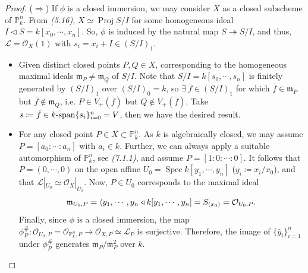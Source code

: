 \documentclass[11pt,a4paper,footinclude=true,headinclude=true]{scrbook} %
\DeclareMathOperator{\Spec}{Spec}
\DeclareMathOperator{\Proj}{Proj}
\newcommand{\LL}{\mathscr{L}}
\newcommand{\OO}{\mathcal{O}}
\newcommand{\PP}{\mathbb{P}}
\newcommand{\mm}{\mathfrak{m}}
\newcommand{\<}{\langle}
\let\>\relax
\newcommand{\>}{\rangle}
\newcommand{\spn}{\mathchar`-\mathrm{span}}
\begin{document}
\begin{proof}
    ($\Rightarrow$) If $\phi$ is a closed immersion, we may consider $X$ as a closed subscheme of $\PP_k^n$. From \textit{(5.16)}, $X\simeq\Proj S/I$ for some homogeneous ideal $I\triangleleft S=k[x_0,\cdots,x_n]$. So, $\phi$ is induced by the natural map $S\twoheadrightarrow S/I$, and thus, $\LL=\OO_X(1)$ with $s_i=x_i+I\in(S/I)_1$.
    \begin{itemize}
        \item[(1)] Given distinct closed points $P,Q\in X$, corresponding to the homogeneous maximal ideals $\mm_P\neq\mm_Q$ of $S/I$. Note that $S/I=k[s_0,\cdots,s_n]$ is finitely generated by $(S/I)_1$ over $(S/I)_0=k$, so $\exists\ \bar{f}\in(S/I)_1$ for which $\bar{f}\in\mm_P$ but $\bar{f}\notin\mm_Q$, i.e. $P\in V_+(\bar{f})$ but $Q\notin V_+(\bar{f})$. Take $s\coloneqq\bar{f}\in k\spn\{s_i\}_{i=0}^n=V$, then we have the desired result.
        \item[(2)] For any closed point $P\in X\subset\PP_k^n$. As $k$ is algebraically closed, we may assume $P=[a_0:\cdots:a_n]$ with $a_i\in k$. Further, we can always apply a suitable automorphism of $\PP_k^n$, see \textit{(7.1.1)}, and assume $P=[1:0:\cdots:0]$. It follows that  $P=(0,\cdots,0)$ on the open affine $U_0=\Spec k[y_1,\cdots,y_n]$ ($y_i\coloneqq x_i/x_0$), and that $\LL|_{U_0}\simeq\OO_X|_{U_0}$. Now, $P\in U_0$ corresponds to the maximal ideal 
        \begin{align*}
            \mm_{U_0,P}=\<y_1,\cdots,y_n\>\triangleleft k[y_1,\cdots,y_n]=S_{(x_0)}=\OO_{U_0,P}.
        \end{align*}
        Finally, since $\phi$ is a closed immersion, the map $\phi_P^\#:\OO_{U_0,P}=\OO_{\PP_k^n,P}\to\OO_{X,P}\simeq\LL_P$ is surjective. Therefore, the image of $\{\bar{y}_i\}_{i=1}^n$ under $\phi_P^\#$ generates $\mm_P/\mm_P^2$ over $k$.
    \end{itemize}
    

\end{proof}
\end{document}
